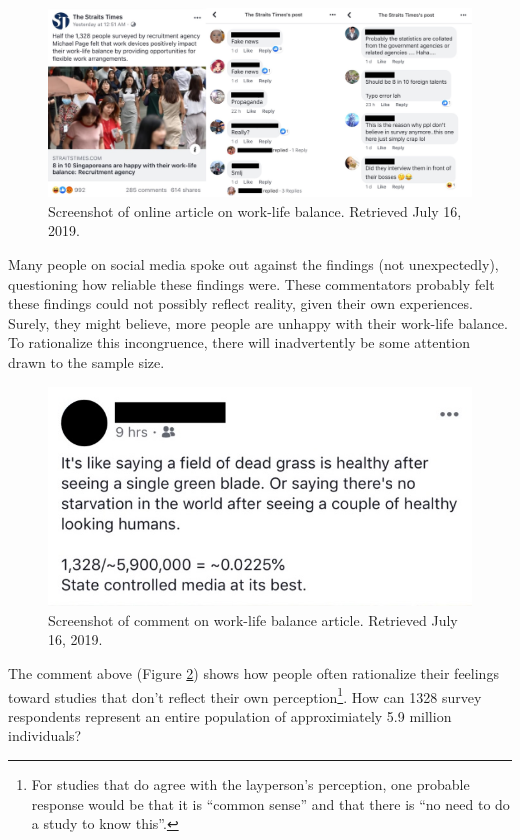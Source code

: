 \documentclass[openany]{book}
\let\rmarkdownfootnote\footnote%
\def\footnote{\protect\rmarkdownfootnote}
\begin{document}
\begin{figure}

{\centering \includegraphics[width=0.9\linewidth]{images/samples/st_worklife} 

}

\caption{Screenshot of online article on work-life balance. Retrieved July 16, 2019.}\label{fig:st-worklife}
\end{figure}

Many people on social media spoke out against the findings (not
unexpectedly), questioning how reliable these findings were. These
commentators probably felt these findings could not possibly reflect
reality, given their own experiences. Surely, they might believe, more
people are unhappy with their work-life balance. To rationalize this
incongruence, there will inadvertently be some attention drawn to the
sample size.

\begin{figure}

{\centering \includegraphics[width=0.6\linewidth]{images/samples/st_samplesize} 

}

\caption{Screenshot of comment on work-life balance article. Retrieved July 16, 2019.}\label{fig:st-samplesize}
\end{figure}

The comment above (Figure \ref{fig:st-samplesize}) shows how people
often rationalize their feelings toward studies that don't reflect their
own perception\footnote{For studies that do agree with the layperson's
  perception, one probable response would be that it is ``common sense''
  and that there is ``no need to do a study to know this''.}. How can
1328 survey respondents represent an entire population of approximiately
5.9 million individuals?
\end{document}
